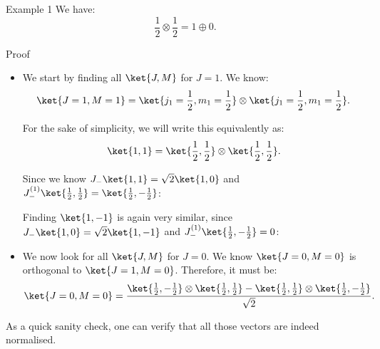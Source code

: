 \documentclass[a4paper]{article}
\begin{document}
\begin{parag}{Example 1}
    We have: 
    \[\frac{1}{2} \otimes \frac{1}{2} = 1 \oplus 0.\]

    \begin{subparag}{Proof}
        \begin{itemize}[left=0pt]
            \item We start by finding all $\ket{J, M}$ for $J = 1$. We know:
            \[\ket{J = 1, M = 1} = \ket{j_1 = \frac{1}{2}, m_1 = \frac{1}{2}} \otimes \ket{j_1 = \frac{1}{2}, m_1 = \frac{1}{2}}.\]

            For the sake of simplicity, we will write this equivalently as: 
            \[\ket{1, 1} = \ket{\frac{1}{2}, \frac{1}{2}} \otimes \ket{\frac{1}{2}, \frac{1}{2}}.\]
        

            Since we know $J_- \ket{1, 1} = \sqrt{2} \ket{1, 0}$ and $J_-^{\left(1\right)} \ket{\frac{1}{2}, \frac{1}{2}} = \ket{\frac{1}{2}, -\frac{1}{2}}$:
            
            Finding $\ket{1, -1}$ is again very similar, since $J_- \ket{1, 0} = \sqrt{2} \ket{1, -1}$ and $J_-^{\left(1\right)} \ket{\frac{1}{2}, -\frac{1}{2}} = 0$: 
             
             \item We now look for all $\ket{J, M}$ for $J = 0$. We know $\ket{J = 0, M = 0}$ is orthogonal to $\ket{J = 1, M = 0}$. Therefore, it must be: 
             \[\ket{J=0, M =0} = \frac{\ket{\frac{1}{2}, -\frac{1}{2}} \otimes \ket{\frac{1}{2}, \frac{1}{2}} - \ket{\frac{1}{2}, \frac{1}{2}} \otimes \ket{\frac{1}{2}, -\frac{1}{2}}}{\sqrt{2}}.\]
        \end{itemize}

        As a quick sanity check, one can verify that all those vectors are indeed normalised.
    \end{subparag}
\end{parag}
\end{document}
